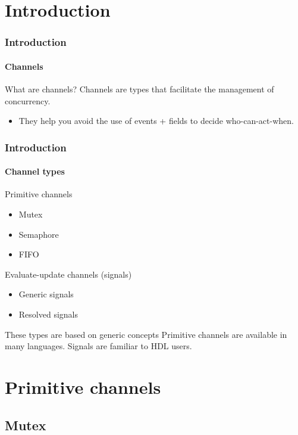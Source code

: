 \section{Introduction}

\begin{frame}
\frametitle{Introduction}
\framesubtitle{Channels}
\begin{block}{What are channels?}
Channels are types that facilitate the management of concurrency.
\begin{itemize}
\item They help you avoid the use of events + fields to decide who-can-act-when.
\end{itemize}
\end{block}
\end{frame}

\begin{frame}
\frametitle{Introduction}
\framesubtitle{Channel types}
\begin{block}{Primitive channels}
\begin{itemize}
\item Mutex
\item Semaphore
\item FIFO
\end{itemize}
\end{block}
\pause
\begin{block}{Evaluate-update channels (signals)}
\begin{itemize}
\item Generic signals
\item Resolved signals
\end{itemize}
\end{block}
\pause
\begin{block}{These types are based on generic concepts}
Primitive channels are available in many languages. Signals are familiar to HDL users.
\end{block}

\end{frame}

\section{Primitive channels}

\subsection{Mutex}

